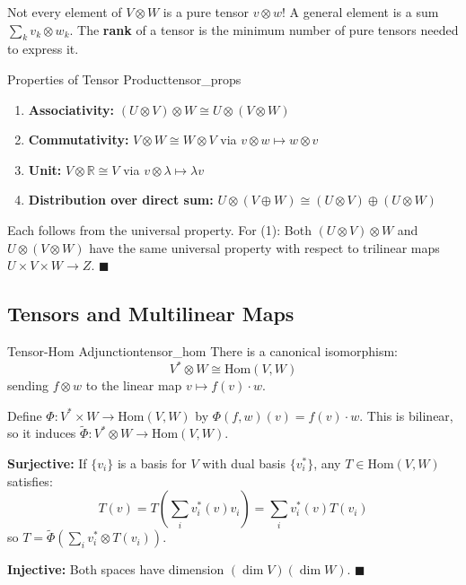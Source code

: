 \documentclass[11pt, letterpaper, openany]{book}
\renewenvironment{proof}[1][\proofname]{%
  \tcolorbox[blanker, breakable, left=1em,
    before skip=1em, after skip=1em,
    borderline west={2pt}{0pt}{MagicTeal!50},
    colback=MagicCream,
    before upper={\textcolor{MagicTeal}{\sffamily\bfseries #1.}\space}
  ]%
}{%
  \hfill\textcolor{MagicTeal}{\ensuremath{\blacksquare}}\endtcolorbox%
}
\begin{document}
\begin{remark}
Not every element of $V \otimes W$ is a pure tensor $v \otimes w$! A general element is a sum $\sum_k v_k \otimes w_k$. The \textbf{rank} of a tensor is the minimum number of pure tensors needed to express it.
\end{remark}

\begin{thm}{Properties of Tensor Product}{tensor_props}
\begin{enumerate}
    \item \textbf{Associativity:} $(U \otimes V) \otimes W \cong U \otimes (V \otimes W)$
    \item \textbf{Commutativity:} $V \otimes W \cong W \otimes V$ via $v \otimes w \mapsto w \otimes v$
    \item \textbf{Unit:} $V \otimes \mathbb{R} \cong V$ via $v \otimes \lambda \mapsto \lambda v$
    \item \textbf{Distribution over direct sum:} $U \otimes (V \oplus W) \cong (U \otimes V) \oplus (U \otimes W)$
\end{enumerate}
\end{thm}

\begin{proof}
Each follows from the universal property. For (1): Both $(U \otimes V) \otimes W$ and $U \otimes (V \otimes W)$ have the same universal property with respect to trilinear maps $U \times V \times W \to Z$.
\end{proof}

\subsection{Tensors and Multilinear Maps}

\begin{thm}{Tensor-Hom Adjunction}{tensor_hom}
There is a canonical isomorphism:
\[V^* \otimes W \cong \text{Hom}(V, W)\]
sending $f \otimes w$ to the linear map $v \mapsto f(v) \cdot w$.
\end{thm}

\begin{proof}
Define $\Phi: V^* \times W \to \text{Hom}(V, W)$ by $\Phi(f, w)(v) = f(v) \cdot w$. This is bilinear, so it induces $\tilde{\Phi}: V^* \otimes W \to \text{Hom}(V, W)$.

\textbf{Surjective:} If $\{v_i\}$ is a basis for $V$ with dual basis $\{v_i^*\}$, any $T \in \text{Hom}(V, W)$ satisfies:
\[T(v) = T\left(\sum_i v_i^*(v) v_i\right) = \sum_i v_i^*(v) T(v_i)\]
so $T = \tilde{\Phi}(\sum_i v_i^* \otimes T(v_i))$.

\textbf{Injective:} Both spaces have dimension $(\dim V)(\dim W)$.
\end{proof}
\end{document}

